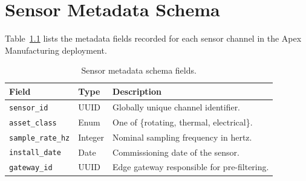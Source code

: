 \chapter{Sensor Metadata Schema}
\label{app:schema}
Table~\ref{tab:schema} lists the metadata fields recorded for each sensor channel in the
Apex Manufacturing deployment.

\begin{table}[htbp]
\centering
\caption{Sensor metadata schema fields.}
\label{tab:schema}
\begin{tabular}{@{}l l p{6.2cm}@{}}
\toprule
Field & Type & Description \\
\midrule
\texttt{sensor\_id} & UUID & Globally unique channel identifier. \\
\texttt{asset\_class} & Enum & One of \{rotating, thermal, electrical\}. \\
\texttt{sample\_rate\_hz} & Integer & Nominal sampling frequency in hertz. \\
\texttt{install\_date} & Date & Commissioning date of the sensor. \\
\texttt{gateway\_id} & UUID & Edge gateway responsible for pre-filtering. \\
\bottomrule
\end{tabular}
\end{table}
